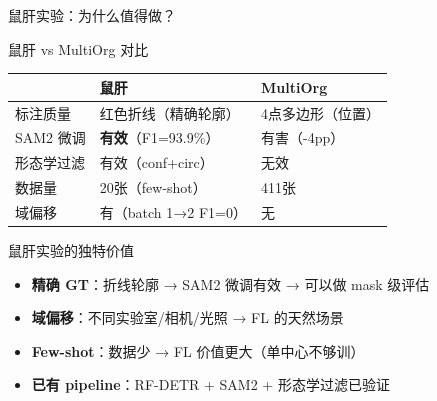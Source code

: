 \documentclass[aspectratio=169, 10pt]{beamer}
\begin{document}
\begin{frame}{鼠肝实验：为什么值得做？}
  \begin{block}{鼠肝 vs MultiOrg 对比}
    \begin{tabular}{p{3.5cm}p{4.5cm}p{4cm}}
      \toprule
      & \textbf{鼠肝} & \textbf{MultiOrg} \\
      \midrule
      标注质量 & 红色折线（精确轮廓） & 4点多边形（位置） \\
      SAM2 微调 & \textbf{有效}（F1=93.9\%） & 有害（-4pp） \\
      形态学过滤 & 有效（conf+circ） & 无效 \\
      数据量 & 20张（few-shot） & 411张 \\
      域偏移 & \alert{有}（batch 1→2 F1=0） & 无 \\
      \bottomrule
    \end{tabular}
  \end{block}
  \vspace{0em}
  \begin{block}{鼠肝实验的独特价值}
    \begin{itemize}
      \item \textbf{精确 GT}：折线轮廓 → SAM2 微调有效 → 可以做 mask 级评估
      \item \textbf{域偏移}：不同实验室/相机/光照 → FL 的天然场景
      \item \textbf{Few-shot}：数据少 → FL 价值更大（单中心不够训）
      \item \textbf{已有 pipeline}：RF-DETR + SAM2 + 形态学过滤已验证
    \end{itemize}
  \end{block}
\end{frame}
\end{document}
